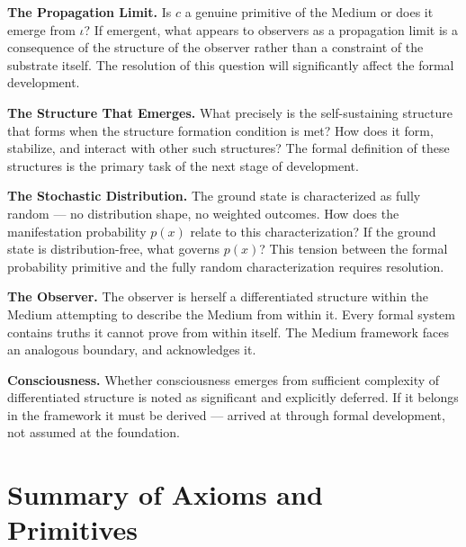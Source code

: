 \documentclass[11pt]{article}
\begin{document}
\textbf{The Propagation Limit.} Is \(c\) a genuine primitive of the Medium or does it
emerge from \(\iota\)? If emergent, what appears to observers as a propagation
limit is a consequence of the structure of the observer rather than a constraint
of the substrate itself. The resolution of this question will significantly
affect the formal development.

\textbf{The Structure That Emerges.} What precisely is the self-sustaining structure
that forms when the structure formation condition is met? How does it form,
stabilize, and interact with other such structures? The formal definition of
these structures is the primary task of the next stage of development.

\textbf{The Stochastic Distribution.} The ground state is characterized as fully random
— no distribution shape, no weighted outcomes. How does the manifestation
probability \(p(x)\) relate to this characterization? If the ground state is
distribution-free, what governs \(p(x)\)? This tension between the formal
probability primitive and the fully random characterization requires resolution.

\textbf{The Observer.} The observer is herself a differentiated structure within the
Medium attempting to describe the Medium from within it. Every formal system
contains truths it cannot prove from within itself. The Medium framework faces
an analogous boundary, and acknowledges it.

\textbf{Consciousness.} Whether consciousness emerges from sufficient complexity of
differentiated structure is noted as significant and explicitly deferred. If it
belongs in the framework it must be derived — arrived at through formal
development, not assumed at the foundation.
\section{Summary of Axioms and Primitives}
\label{sec:orgb38b6d0}
\end{document}
